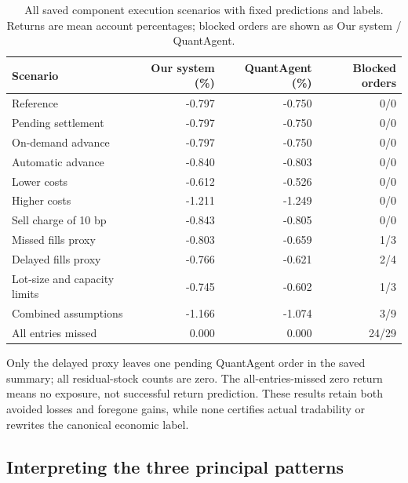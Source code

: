 \begin{table}[!htb]\centering\small{}\setlength{\tabcolsep}{4pt}
\caption[Recorded component execution scenarios]{All saved component execution scenarios with fixed predictions and labels. Returns are mean account percentages; blocked orders are shown as Our system / QuantAgent.}\label{tab:execution}
\begin{tabular}{@{}P{.41\linewidth}rrr@{}}\toprule
Scenario & Our system (\%) & QuantAgent (\%) & Blocked orders\\\midrule
Reference & -0.797 & -0.750 & 0/0\\
Pending settlement & -0.797 & -0.750 & 0/0\\
On-demand advance & -0.797 & -0.750 & 0/0\\
Automatic advance & -0.840 & -0.803 & 0/0\\
Lower costs & -0.612 & -0.526 & 0/0\\
Higher costs & -1.211 & -1.249 & 0/0\\
Sell charge of 10 bp & -0.843 & -0.805 & 0/0\\
Missed fills proxy & -0.803 & -0.659 & 1/3\\
Delayed fills proxy & -0.766 & -0.621 & 2/4\\
Lot-size and capacity limits & -0.745 & -0.602 & 1/3\\
Combined assumptions & -1.166 & -1.074 & 3/9\\
All entries missed & 0.000 & 0.000 & 24/29\\
\bottomrule\end{tabular}\end{table}

Only the delayed proxy leaves one pending QuantAgent order in the saved
summary; all residual-stock counts are zero. The all-entries-missed
zero return means no exposure, not successful return prediction. These
results retain both avoided losses and foregone gains, while none
certifies actual tradability or rewrites the canonical economic label.

\subsection{Interpreting the three principal patterns}\label{sec:mechanism-discussion}
